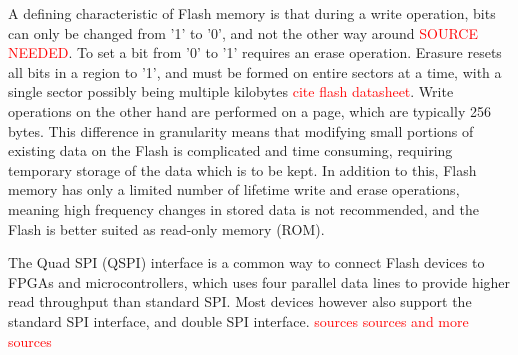 A defining characteristic of Flash memory is that during a write operation, bits can only be changed from '1' to '0', and not the other way around \textcolor{red}{SOURCE NEEDED}. To set a bit from '0' to '1' requires an erase operation. Erasure resets all bits in a region to '1', and must be formed on entire sectors at a time, with a single sector possibly being multiple kilobytes \textcolor{red}{cite flash datasheet}. Write operations on the other hand are performed on a page, which are typically 256 bytes. This difference in granularity means that modifying small portions of existing data on the Flash is complicated and time consuming, requiring temporary storage of the data which is to be kept. In addition to this, Flash memory has only a limited number of lifetime write and erase operations, meaning high frequency changes in stored data is not recommended, and the Flash is better suited as read-only memory (ROM).

The Quad SPI (QSPI) interface is a common way to connect Flash devices to FPGAs and microcontrollers, which uses four parallel data lines to  provide higher read throughput than standard SPI. Most devices however also support the standard SPI interface, and double SPI interface. \textcolor{red}{sources sources and more sources}
